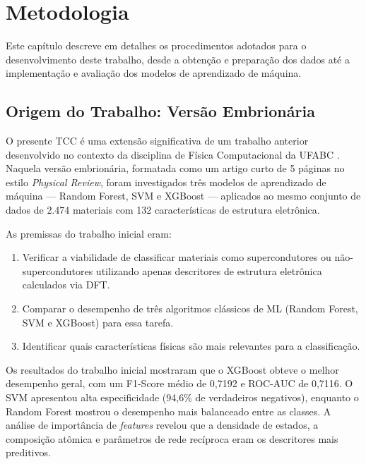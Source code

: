 \documentclass[12pt, a4paper, oneside]{report}
\begin{document}
\chapter{Metodologia}
\label{chap:metodologia}

Este capítulo descreve em detalhes os procedimentos adotados para o desenvolvimento deste trabalho, desde a obtenção e preparação dos dados até a implementação e avaliação dos modelos de aprendizado de máquina.

\section{Origem do Trabalho: Versão Embrionária}
\label{sec:versao_embrionaria}

O presente TCC é uma extensão significativa de um trabalho anterior desenvolvido no contexto da disciplina de Física Computacional da UFABC \cite{delucca2025}. Naquela versão embrionária, formatada como um artigo curto de 5 páginas no estilo \textit{Physical Review}, foram investigados três modelos de aprendizado de máquina --- Random Forest, SVM e XGBoost --- aplicados ao mesmo conjunto de dados de 2.474 materiais com 132 características de estrutura eletrônica.

As premissas do trabalho inicial eram:
\begin{enumerate}
    \item Verificar a viabilidade de classificar materiais como supercondutores ou não-supercondutores utilizando apenas descritores de estrutura eletrônica calculados via DFT.
    \item Comparar o desempenho de três algoritmos clássicos de ML (Random Forest, SVM e XGBoost) para essa tarefa.
    \item Identificar quais características físicas são mais relevantes para a classificação.
\end{enumerate}

Os resultados do trabalho inicial mostraram que o XGBoost obteve o melhor desempenho geral, com um F1-Score médio de 0,7192 e ROC-AUC de 0,7116. O SVM apresentou alta especificidade (94,6\% de verdadeiros negativos), enquanto o Random Forest mostrou o desempenho mais balanceado entre as classes. A análise de importância de \textit{features} revelou que a densidade de estados, a composição atômica e parâmetros de rede recíproca eram os descritores mais preditivos.
\end{document}
